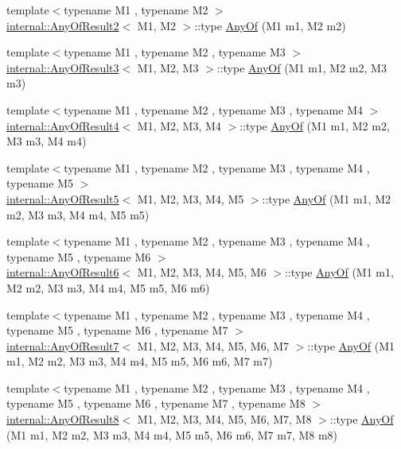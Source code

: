 \begin{DoxyCompactItemize}
\item 
{\footnotesize template$<$typename M1 , typename M2 $>$ }\\\mbox{\hyperlink{structtesting_1_1internal_1_1_any_of_result2}{internal\+::\+Any\+Of\+Result2}}$<$ M1, M2 $>$\+::type \mbox{\hyperlink{namespacetesting_a81cfefd9f75cdce827d5bc873cf73aac}{Any\+Of}} (M1 m1, M2 m2)
\item 
{\footnotesize template$<$typename M1 , typename M2 , typename M3 $>$ }\\\mbox{\hyperlink{structtesting_1_1internal_1_1_any_of_result3}{internal\+::\+Any\+Of\+Result3}}$<$ M1, M2, M3 $>$\+::type \mbox{\hyperlink{namespacetesting_a3ccbde3ba01189587676d44a4333c0a5}{Any\+Of}} (M1 m1, M2 m2, M3 m3)
\item 
{\footnotesize template$<$typename M1 , typename M2 , typename M3 , typename M4 $>$ }\\\mbox{\hyperlink{structtesting_1_1internal_1_1_any_of_result4}{internal\+::\+Any\+Of\+Result4}}$<$ M1, M2, M3, M4 $>$\+::type \mbox{\hyperlink{namespacetesting_a1cfcacf2cf19543b86445e3585d5356f}{Any\+Of}} (M1 m1, M2 m2, M3 m3, M4 m4)
\item 
{\footnotesize template$<$typename M1 , typename M2 , typename M3 , typename M4 , typename M5 $>$ }\\\mbox{\hyperlink{structtesting_1_1internal_1_1_any_of_result5}{internal\+::\+Any\+Of\+Result5}}$<$ M1, M2, M3, M4, M5 $>$\+::type \mbox{\hyperlink{namespacetesting_a049ea436e52c242adc44b2b42dc03e50}{Any\+Of}} (M1 m1, M2 m2, M3 m3, M4 m4, M5 m5)
\item 
{\footnotesize template$<$typename M1 , typename M2 , typename M3 , typename M4 , typename M5 , typename M6 $>$ }\\\mbox{\hyperlink{structtesting_1_1internal_1_1_any_of_result6}{internal\+::\+Any\+Of\+Result6}}$<$ M1, M2, M3, M4, M5, M6 $>$\+::type \mbox{\hyperlink{namespacetesting_a747189264a49a426004366371f1a2575}{Any\+Of}} (M1 m1, M2 m2, M3 m3, M4 m4, M5 m5, M6 m6)
\item 
{\footnotesize template$<$typename M1 , typename M2 , typename M3 , typename M4 , typename M5 , typename M6 , typename M7 $>$ }\\\mbox{\hyperlink{structtesting_1_1internal_1_1_any_of_result7}{internal\+::\+Any\+Of\+Result7}}$<$ M1, M2, M3, M4, M5, M6, M7 $>$\+::type \mbox{\hyperlink{namespacetesting_a754d1bddb237e79613f6834af3329efa}{Any\+Of}} (M1 m1, M2 m2, M3 m3, M4 m4, M5 m5, M6 m6, M7 m7)
\item 
{\footnotesize template$<$typename M1 , typename M2 , typename M3 , typename M4 , typename M5 , typename M6 , typename M7 , typename M8 $>$ }\\\mbox{\hyperlink{structtesting_1_1internal_1_1_any_of_result8}{internal\+::\+Any\+Of\+Result8}}$<$ M1, M2, M3, M4, M5, M6, M7, M8 $>$\+::type \mbox{\hyperlink{namespacetesting_a9c979c62cc004664b14e0ce444e531d5}{Any\+Of}} (M1 m1, M2 m2, M3 m3, M4 m4, M5 m5, M6 m6, M7 m7, M8 m8)

\end{DoxyCompactItemize}
